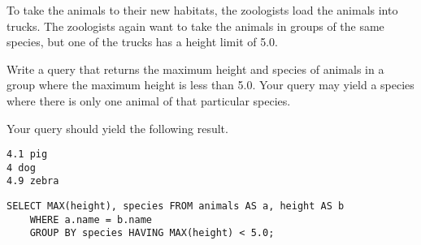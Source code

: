 \begin{blocksection}
\question To take the animals to their new habitats, the zoologists load the animals into trucks.  The zoologists again want to take the animals in groups of the same species, but one of the trucks has a height limit of 5.0.
 
Write a query that returns the maximum height and species of animals in a group where the maximum height is less than 5.0.  Your query may yield a species where there is only one animal of that particular species.

Your query should yield the following result.

\begin{lstlisting}
4.1 pig
4 dog
4.9 zebra
\end{lstlisting}

\begin{solution}[1in]
\begin{lstlisting}
SELECT MAX(height), species FROM animals AS a, height AS b
    WHERE a.name = b.name
    GROUP BY species HAVING MAX(height) < 5.0;
\end{lstlisting}
\end{solution}
\end{blocksection}
